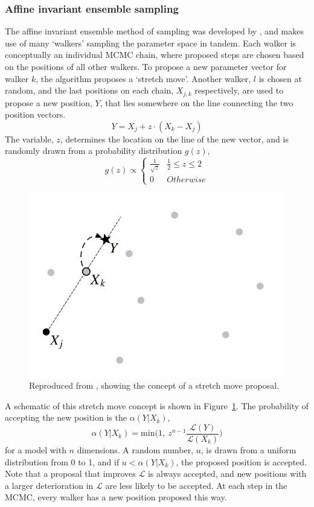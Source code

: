 \subsubsection{Affine invariant ensemble sampling}
\label{sect:modelling:Affine invariant ensemble sampling}
The affine invariant ensemble method of sampling was developed by \citet{goodman2010}, and makes use of many `walkers' sampling the parameter space in tandem.
Each walker is conceptually an individual MCMC chain, where proposed steps are chosen based on the positions of all other walkers. To propose a new parameter vector for walker $k$, the algorithm proposes a `stretch move'. Another walker, $l$ is chosen at random, and the last positions on each chain, $X_{j,k}$ respectively, are used to propose a new position, $Y$, that lies somewhere on the line connecting the two position vectors.
\begin{equation}
    Y = X_j + z \cdot (X_k - X_j)
\end{equation}
The variable, $z$, determines the location on the line of the new vector, and is randomly drawn from a probability distribution $g(z)$,
\begin{equation}
    g(z) \propto
    \begin{cases}
        \frac{1}{\sqrt{z}} & \frac{1}{2} \le z \le 2 \\
        0 & Otherwise
    \end{cases}
\end{equation}
\begin{figure}
    \centering
    \includegraphics[width=.7\textwidth]{figures/modelling/stretch_move.png}
    \caption{Reproduced from \citet{goodman2010}, showing the concept of a stretch move proposal.}
    \label{fig:modelling:stretch move}
\end{figure}
A schematic of this stretch move concept is shown in Figure~\ref{fig:modelling:stretch move}. The probability of accepting the new position is the $\alpha(Y|X_k)$,
\begin{equation}
    \alpha(Y|X_k) = \mathrm{min}\bigg( 1,\ z^{n-1}\frac{\mathcal{L}(Y)}{\mathcal{L}(X_k)} \bigg)
\end{equation}
for a model with $n$ dimensions. A random number, $u$, is drawn from a uniform distribution from 0 to 1, and if $u < \alpha(Y|X_k)$, the proposed position is accepted. Note that a proposal that improves $\mathcal{L}$ is always accepted, and new positions with a larger deterioration in $\mathcal{L}$ are less likely to be accepted. At each step in the MCMC, every walker has a new position proposed this way.

